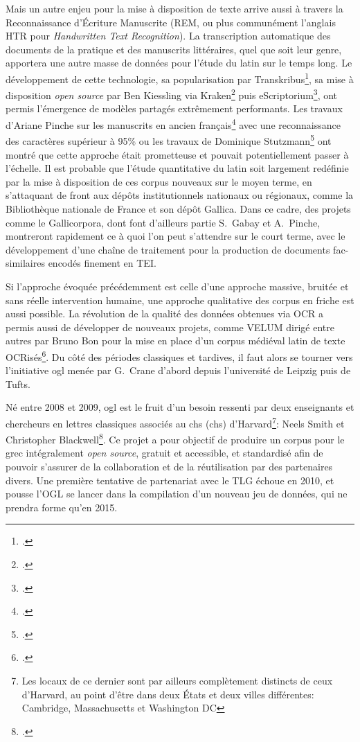 Mais un autre enjeu pour la mise à disposition de texte arrive aussi à travers la Reconnaissance d'Écriture Manuscrite (REM, ou plus communément l'anglais HTR pour \textit{Handwritten Text Recognition}). La transcription automatique des documents de la pratique et des manuscrits littéraires, quel que soit leur genre, apportera une autre masse de données pour l'étude du latin sur le temps long. Le développement de cette technologie, sa popularisation par Transkribus\footcite{kahle2017transkribus}, sa mise à disposition \textit{open source} par Ben Kiessling via Kraken\footcite{kiessling2019kraken} puis eScriptorium\footcite{kiessling_escripto}, ont permis l'émergence de modèles partagés extrêmement performants. Les travaux d'Ariane Pinche sur les manuscrits en ancien français\footcite{Pinche_CREMMA_Medieval_an_2021} avec une reconnaissance des caractères supérieur à 95\% ou les travaux de Dominique Stutzmann\footcite{hazem2020books} ont montré que cette approche était prometteuse et pouvait potentiellement passer à l'échelle. Il est probable que l'étude quantitative du latin soit largement redéfinie par la mise à disposition de ces corpus nouveaux sur le moyen terme, en s'attaquant de front aux dépôts institutionnels nationaux ou régionaux, comme la Bibliothèque nationale de France et son dépôt Gallica. Dans ce cadre, des projets comme le Gallicorpora, dont font d'ailleurs partie S.~Gabay et A.~Pinche, montreront rapidement ce à quoi l'on peut s'attendre sur le court terme, avec le développement d'une chaîne de traitement pour la production de documents fac-similaires encodés finement en TEI.

Si l'approche évoquée précédemment est celle d'une approche massive, bruitée et sans réelle intervention humaine, une approche qualitative des corpus en friche est aussi possible. La révolution de la qualité des données obtenues via OCR a permis aussi de développer de nouveaux projets, comme VELUM dirigé entre autres par Bruno Bon pour la mise en place d'un corpus médiéval latin de texte OCRisés\footcite{bon2019challenges}. Du côté des périodes classiques et tardives, il faut alors se tourner vers l'initiative \acrfull{ogl} menée par G.~Crane d'abord depuis l'université de Leipzig puis de Tufts.

Né entre 2008 et 2009, \acrshort{ogl} est le fruit d'un besoin ressenti par deux enseignants et chercheurs en lettres classiques associés au \acrfull{chs} (\acrshort{chs}) d'Harvard\footnote{Les locaux de ce dernier sont par ailleurs complètement distincts de ceux d'Harvard, au point d'être dans deux États et deux villes différentes: Cambridge, Massachusetts et Washington DC}: Neels Smith et Christopher Blackwell\footcite{muellner2019free}. Ce projet a pour objectif de produire un corpus pour le grec intégralement \textit{open source}, gratuit et accessible, et standardisé afin de pouvoir s'assurer de la collaboration et de la réutilisation par des partenaires divers. Une première tentative de partenariat avec le TLG échoue en 2010, et pousse l'OGL se lancer dans la compilation d'un nouveau jeu de données, qui ne prendra forme qu'en 2015.

